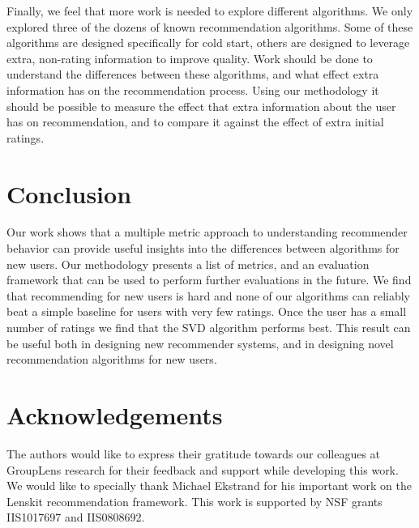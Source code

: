 \documentclass[letterpaper]{sig-alternate}
\begin{document}
  Finally, we feel that more work is needed to explore different algorithms.
  We only explored three of the dozens of known recommendation algorithms.
  Some of these algorithms are designed specifically for cold start, others are designed to leverage extra, non-rating information to improve quality.
  Work should be done to understand the differences between these algorithms, and what effect extra information has on the recommendation process.
  Using our methodology it should be possible to measure the effect that extra information about the user has on recommendation, and to compare it against the effect of extra initial ratings.



\section{Conclusion}

  Our work shows that a multiple metric approach to understanding recommender behavior can provide useful insights into the differences between algorithms for new users.
  Our methodology presents a list of metrics, and an evaluation framework that can be used to perform further evaluations in the future.
  We find that recommending for new users is hard and none of our algorithms can reliably beat a simple baseline for users with very few ratings.
  Once the user has a small number of ratings we find that the SVD algorithm performs best.
  This result can be useful both in designing new recommender systems, and in designing novel recommendation algorithms for new users.


\section{Acknowledgements}
  
  The authors would like to express their gratitude towards our colleagues at GroupLens research for their feedback and support while developing this work.
  We would like to specially thank Michael Ekstrand for his  important work on the Lenskit recommendation framework.
  This work is supported by NSF grants IIS1017697 and IIS0808692.


\end{document}
